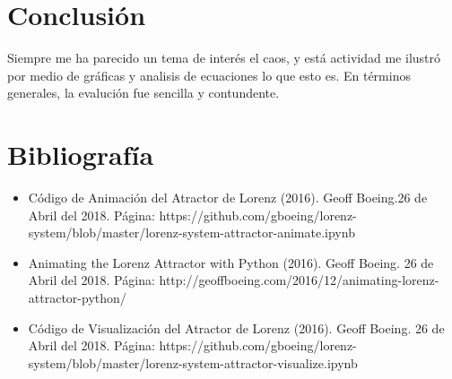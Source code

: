 \documentclass{article}
\begin{document}
\section{Conclusión}
Siempre me ha parecido un tema de interés el caos, y está actividad me ilustró por medio de gráficas y analisis de ecuaciones lo que esto es. En términos generales, la evalución fue sencilla y contundente.

\section{Bibliografía}
\begin{itemize}
\item Código de Animación del Atractor de Lorenz (2016). Geoff Boeing.26 de Abril del 2018. Página:  https://github.com/gboeing/lorenz-system/blob/master/lorenz-system-attractor-animate.ipynb
\item Animating the Lorenz Attractor with Python (2016). Geoff Boeing. 26 de Abril del 2018. Página: http://geoffboeing.com/2016/12/animating-lorenz-attractor-python/
\item Código de Visualización del Atractor de Lorenz (2016). Geoff Boeing. 26 de Abril del 2018. Página:  https://github.com/gboeing/lorenz-system/blob/master/lorenz-system-attractor-visualize.ipynb

\end{itemize}
\end{document}
